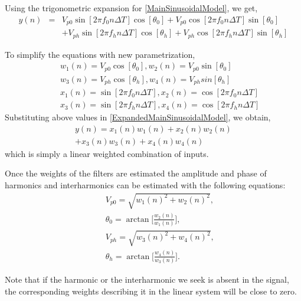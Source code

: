 \documentclass{UCF_ETD}
\begin{document}
Using the trigonometric expansion for \eqref{MainSinusoidalModel}, we get,
\begin{eqnarray}  \label{ExpandedMainSinusoidalModel}
y(n)&{}={}&V_{p0} \sin[2\pi f_0 n\Delta T] \cos[\theta_0]  +V_{p0} \cos[2\pi f_0 n\Delta T] \sin[\theta_0]   \nonumber \\
&&+V_{ph} \sin[2\pi f_h n\Delta T]\cos[\theta_h]     +V_{ph} \cos[2\pi f_h n\Delta T] \sin[\theta_h]
\end{eqnarray}

To simplify the equations with new parametrization, 
\begin{eqnarray*}
&&w_1(n)=  V_{p0}\cos[\theta_0], w_2(n)=  V_{p0}\sin[\theta_0]  \\
&&w_3(n)=  V_{ph}\cos[\theta_h], w_4(n)=  V_{ph}sin[\theta_h]  \\
&&x_1(n)=  \sin[2\pi f_0 n\Delta T], x_2(n)=  \cos[2\pi f_0 n\Delta T]  \\
&&x_3(n)=  \sin[2\pi f_h n\Delta T], x_4(n)=  \cos[2\pi f_h n\Delta T]
\end{eqnarray*}
\indent Substituting above values in \eqref{ExpandedMainSinusoidalModel}, we obtain,
\begin{eqnarray}
y(n) = x_1(n)w_1(n)+x_2(n)w_2(n) \nonumber \\
+x_3(n)w_3(n)+x_4(n)w_4(n)
\end{eqnarray}
which is simply a linear weighted combination of inputs.

Once the weights of the filters are estimated the amplitude and phase of harmonics and interharmonics can be estimated with the following equations:
\begin{eqnarray*}
&&V_{p0} = \sqrt{w_1(n)^2+w_2(n)^2},  \\
&&\theta_0 =\arctan \Big[\frac{w_2(n)}{w_1(n)} \Big ], \\
&&V_{ph}= \sqrt{w_3(n)^2+w_4(n)^2} , \\
&&\theta_h =\arctan \Big[\frac{w_4(n)}{w_3(n)} \Big ].
\end{eqnarray*}

Note that if the harmonic or the interharmonic we seek is absent in the signal, the corresponding weights describing it in the linear system will be close to zero.
\end{document}

